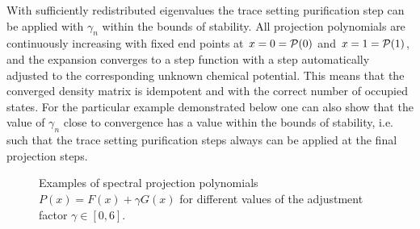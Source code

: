 \commentoutA{\documentclass[prb,aps,twocolumn,twocolumngrid,secnumarabic,superbib,hyperref]{revtex4}}
\begin{document}
With sufficiently
redistributed eigenvalues the trace setting purification
step can be applied with $\gamma_n$ within
the bounds of stability. All projection
polynomials are continuously increasing with fixed end
points at $x=0={\cal P}(0)$ and $x=1={\cal P}(1)$, and the expansion 
converges to a step function with a step automatically adjusted to
the corresponding unknown chemical potential. This means
that the converged density matrix is idempotent and with
the correct number of occupied states. For the particular
example demonstrated below one can also show that the
value of $\gamma_n$ close to convergence has a value within
the bounds of stability, i.e. such that the trace setting
purification steps always can be applied at the final projection steps.

%

\begin{figure}[t]
\caption{Examples of spectral projection polynomials $P(x) = F(x) + \gamma G(x)$
for different values of the adjustment factor $\gamma \in [0,6]$.} \label{Fig_F_G}
\end{figure}
\end{document}
